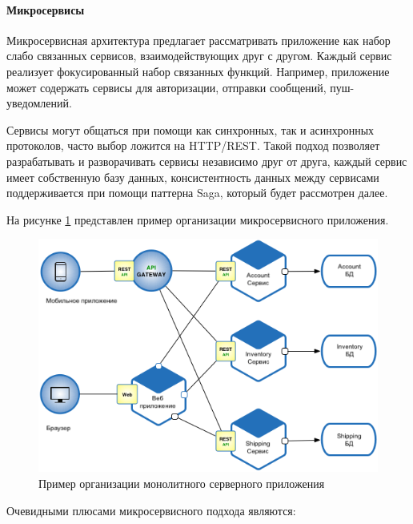 \paragraph {Микросервисы}
Микросервисная архитектура предлагает рассматривать приложение как набор слабо связанных сервисов, взаимодействующих друг с другом. Каждый сервис реализует фокусированный набор связанных функций. Например, приложение может содержать сервисы для авторизации, отправки сообщений, пуш-уведомлений.

Сервисы могут общаться при помощи как синхронных, так и асинхронных протоколов, часто выбор ложится на HTTP/REST. Такой подход позволяет разрабатывать и разворачивать сервисы независимо друг от друга, каждый сервис имеет собственную базу данных, консистентность данных между сервисами поддерживается при помощи паттерна Saga, который будет рассмотрен далее. \cite{microservices:ms}

На рисунке \ref{sec:analysis:research:arch:back:micro} представлен пример организации микросервисного приложения.

\begin{figure}[h]
  \centering
    \includegraphics[width=1\textwidth]{inc/img/backend-micro.png}
  \caption{Пример организации монолитного серверного приложения}
  \label{sec:analysis:research:arch:back:micro}
\end{figure}

Очевидными плюсами микросервисного подхода являются:

